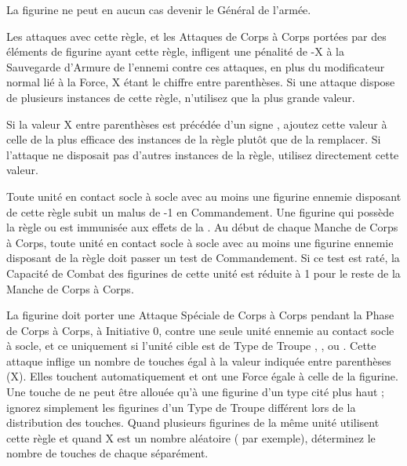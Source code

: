 
La figurine ne peut en aucun cas devenir le Général de l'armée.


Les attaques avec cette règle, et les Attaques de Corps à Corps portées par des éléments de figurine ayant cette règle, infligent une pénalité de -X à la Sauvegarde d'Armure de l'ennemi contre ces attaques, en plus du modificateur normal lié à la Force, X étant le chiffre entre parenthèses. Si une attaque dispose de plusieurs instances de cette règle, n'utilisez que la plus grande valeur.

Si la valeur X entre parenthèses est précédée d'un signe \result{+}, ajoutez cette valeur à celle de la plus efficace des instances de la règle \armourpiercing{} plutôt que de la remplacer. Si l'attaque ne disposait pas d'autres instances de la règle, utilisez directement cette valeur.


Toute unité en contact socle à socle avec au moins une figurine ennemie disposant de cette règle subit un malus de -1 en Commandement. Une figurine qui possède la règle \immunetopsychology{} ou \fear{} est immunisée aux effets de la \fear{}. Au début de chaque Manche de Corps à Corps, toute unité en contact socle à socle avec au moins une figurine ennemie disposant de la règle \fear{} doit passer un test de Commandement. Si ce test est raté, la Capacité de Combat des figurines de cette unité est réduite à 1 pour le reste de la Manche de Corps à Corps.


La figurine doit porter une Attaque Spéciale de Corps à Corps pendant la Phase de Corps à Corps, à Initiative 0, contre une seule unité ennemie au contact socle à socle, et ce uniquement si l'unité cible est de Type de Troupe \infantry{}, \warbeast{}, \swarm{} ou \warmachine{}. Cette attaque inflige un nombre de touches égal à la valeur indiquée entre parenthèses (X). Elles touchent automatiquement et ont une Force égale à celle de la figurine. Une touche de \stomp{} ne peut être allouée qu'à une figurine d'un type cité plus haut ; ignorez simplement les figurines d'un Type de Troupe différent lors de la distribution des touches. Quand plusieurs figurines de la même unité utilisent cette règle et quand X est un nombre aléatoire ( par exemple), déterminez le nombre de touches de chaque \stomp{} séparément.

